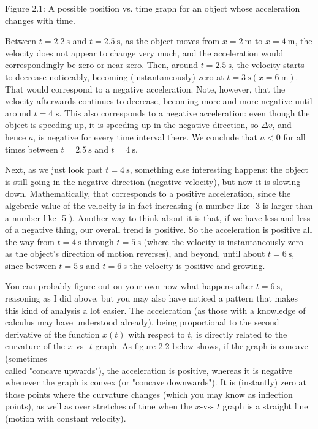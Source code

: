 \documentclass[10pt]{article}
\begin{document}
Figure 2.1: A possible position vs. time graph for an object whose acceleration changes with time.

Between $t=2.2 \mathrm{~s}$ and $t=2.5 \mathrm{~s}$, as the object moves from $x=2 \mathrm{~m}$ to $x=4 \mathrm{~m}$, the velocity does not appear to change very much, and the acceleration would correspondingly be zero or near zero. Then, around $t=2.5 \mathrm{~s}$, the velocity starts to decrease noticeably, becoming (instantaneously) zero at $t=3 \mathrm{~s}(x=6 \mathrm{~m})$. That would correspond to a negative acceleration. Note, however, that the velocity afterwards continues to decrease, becoming more and more negative until around $t=4$ s. This also corresponds to a negative acceleration: even though the object is speeding up, it is speeding up in the negative direction, so $\Delta v$, and hence $a$, is negative for every time interval there. We conclude that $a<0$ for all times between $t=2.5 \mathrm{~s}$ and $t=4 \mathrm{~s}$.

Next, as we just look past $t=4 \mathrm{~s}$, something else interesting happens: the object is still going in the negative direction (negative velocity), but now it is slowing down. Mathematically, that corresponds to a positive acceleration, since the algebraic value of the velocity is in fact increasing (a number like -3 is larger than a number like -5 ). Another way to think about it is that, if we have less and less of a negative thing, our overall trend is positive. So the acceleration is positive all the way from $t=4 \mathrm{~s}$ through $t=5 \mathrm{~s}$ (where the velocity is instantaneously zero as the object's direction of motion reverses), and beyond, until about $t=6 \mathrm{~s}$, since between $t=5 \mathrm{~s}$ and $t=6 \mathrm{~s}$ the velocity is positive and growing.

You can probably figure out on your own now what happens after $t=6 \mathrm{~s}$, reasoning as I did above, but you may also have noticed a pattern that makes this kind of analysis a lot easier. The acceleration (as those with a knowledge of calculus may have understood already), being proportional to the second derivative of the function $x(t)$ with respect to $t$, is directly related to the curvature of the $x$-vs- $t$ graph. As figure 2.2 below shows, if the graph is concave (sometimes\\
called "concave upwards"), the acceleration is positive, whereas it is negative whenever the graph is convex (or "concave downwards"). It is (instantly) zero at those points where the curvature changes (which you may know as inflection points), as well as over stretches of time when the $x$-vs- $t$ graph is a straight line (motion with constant velocity).
\end{document}
